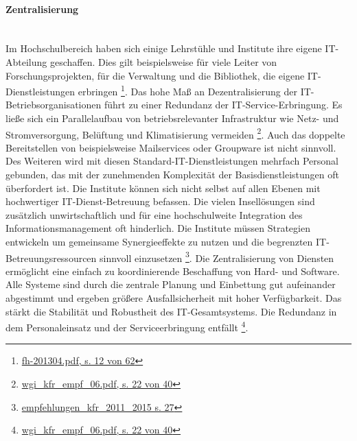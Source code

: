 \paragraph{Zentralisierung}\mbox{}\\
Im Hochschulbereich haben sich einige Lehrstühle und Institute ihre eigene IT-Abteilung geschaffen. Dies gilt beispielsweise für viele Leiter von Forschungsprojekten, für die Verwaltung und die Bibliothek, die eigene IT-Dienstleistungen erbringen \footnote{\url{fh-201304.pdf, s. 12 von 62}}. Das hohe Maß an Dezentralisierung der IT-Betriebsorganisationen führt zu einer Redundanz der IT-Service-Erbringung. Es ließe sich ein Parallelaufbau von betriebsrelevanter Infrastruktur wie Netz- und Stromversorgung, Belüftung und Klimatisierung vermeiden \footnote{\url{wgi_kfr_empf_06.pdf, s. 22 von 40}}. Auch das doppelte Bereitstellen von beispielsweise Mailservices oder Groupware ist nicht sinnvoll. Des Weiteren wird mit diesen Standard-IT-Dienstleistungen mehrfach Personal gebunden, das mit der zunehmenden Komplexität der Basisdienstleistungen oft überfordert ist. 
Die Institute können sich nicht selbst auf allen Ebenen mit hochwertiger IT-Dienst-Betreuung befassen. Die vielen Insellösungen sind zusätzlich unwirtschaftlich und für eine hochschulweite Integration des Informationsmanagement oft hinderlich. Die Institute müssen Strategien entwickeln um gemeinsame Synergieeffekte zu nutzen und die begrenzten IT-Betreuungsressourcen sinnvoll einzusetzen \footnote{\url{empfehlungen_kfr_2011_2015 s. 27}}.
Die Zentralisierung von Diensten ermöglicht eine einfach zu koordinierende Beschaffung von Hard- und Software. Alle Systeme sind durch die zentrale Planung und Einbettung gut aufeinander abgestimmt und ergeben größere Ausfallsicherheit mit hoher Verfügbarkeit. Das stärkt die Stabilität und Robustheit des IT-Gesamtsystems. Die Redundanz in dem Personaleinsatz und der Serviceerbringung entfällt \footnote{\url{wgi_kfr_empf_06.pdf, s. 22 von 40}}. 


